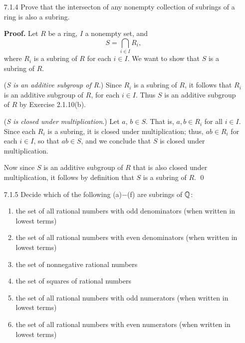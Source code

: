 \begin{enumerate}
      \textbf{Converse.} Let $R = \Q$ and $S = \Z$. The integer 2 is a unit in
      $\Q$ but not a unit in $\Z$. \qed
   \item[7.1.4]   Prove that the intersecton of any nonempty collection of
                  subrings of a ring is also a subring.

      \textbf{Proof.} Let $R$ be a ring, $I$ a nonempty set, and
      $$S = \bigcap_{i \in I} R_i,$$
      where $R_i$ is a subring of $R$ for each $i \in I$. We want to show that
      $S$
      is a subring of $R$.

      (\textit{S is an additive subgroup of R}.) Since $R_i$ is a subring
      of $R$, it follows that $R_i$ is an additive subgroup of $R$, for each
      $i \in I$. Thus $S$ is an additive subgroup of $R$ by Exercise 2.1.10(b).

      (\textit{S is closed under multiplication}.) Let $a$, $b \in S$. That is, 
      $a, b \in R_i$ for all $i \in I$. Since each $R_i$ is a subring, it is 
      closed under multiplication; thus, $ab \in R_i$ for each $i \in I$, so 
      that $ab \in S$, and we conclude that $S$ is closed under multiplication.

      Now since $S$ is an additive subgroup of $R$ that is also closed under 
      multiplication, it follows by definition that $S$ is a subring of $R$.
      \qed
   \item[7.1.5]   Decide which of the following (a)$-$(f) are subrings of $\Q$:
                  \begin{enumerate}
                     \item the set of all rational numbers with odd denominators
                           (when written in lowest terms)
                     \item the set of all rational numbers with even
                           denominators (when written in lowest terms)
                     \item the set of nonnegative rational numbers
                     \item the set of squares of rational numbers
                     \item the set of all rational numbers with odd numerators
                           (when written in lowest terms)
                     \item the set of all rational numbers with even numerators
                           (when written in lowest terms)
                  \end{enumerate}


\end{enumerate}
